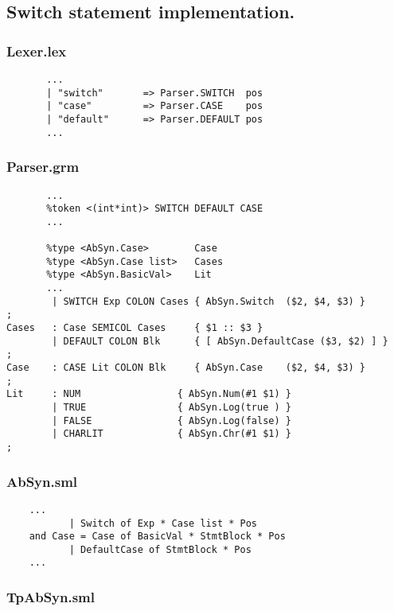 \documentclass[12pt]{article}
\begin{document}
\pagebreak

\subsection{Switch statement implementation.}

\subsubsection{Lexer.lex}

\begin{lstlisting}
       ...
       | "switch"       => Parser.SWITCH  pos
       | "case"         => Parser.CASE    pos
       | "default"      => Parser.DEFAULT pos
       ...
\end{lstlisting}

\subsubsection{Parser.grm}

\begin{lstlisting}
       ...
       %token <(int*int)> SWITCH DEFAULT CASE
       ...
       
       %type <AbSyn.Case>        Case
       %type <AbSyn.Case list>   Cases
       %type <AbSyn.BasicVal>    Lit
       ...
        | SWITCH Exp COLON Cases { AbSyn.Switch  ($2, $4, $3) }
;
Cases   : Case SEMICOL Cases     { $1 :: $3 }
        | DEFAULT COLON Blk      { [ AbSyn.DefaultCase ($3, $2) ] }
;
Case    : CASE Lit COLON Blk     { AbSyn.Case    ($2, $4, $3) }
;
Lit     : NUM                 { AbSyn.Num(#1 $1) }
        | TRUE                { AbSyn.Log(true ) }
        | FALSE               { AbSyn.Log(false) }
        | CHARLIT             { AbSyn.Chr(#1 $1) }
;
\end{lstlisting}

\subsubsection{AbSyn.sml}

\begin{lstlisting}
    ...
           | Switch of Exp * Case list * Pos
    and Case = Case of BasicVal * StmtBlock * Pos
           | DefaultCase of StmtBlock * Pos
    ...
\end{lstlisting}

\pagebreak

\subsubsection{TpAbSyn.sml}
\end{document}
